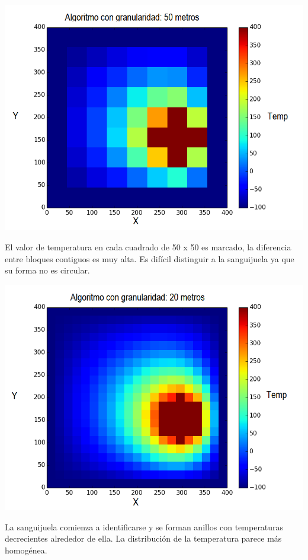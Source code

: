 	\begin{center}
		\includegraphics[scale=0.5]{./img/granularidad/g50_t400_sinkill.png}
	\end{center}

	El valor de temperatura en cada cuadrado de 50 x 50 es marcado, la diferencia entre bloques contiguos es muy alta. Es difícil distinguir a la sanguijuela ya que su forma no es circular.

	\begin{center}
		\includegraphics[scale=0.5]{./img/granularidad/g20_t400_sinkill.png}
	\end{center}

	La sanguijuela comienza a identificarse y se forman anillos con temperaturas decrecientes alrededor de ella. La distribución de la temperatura parece más homogénea.

